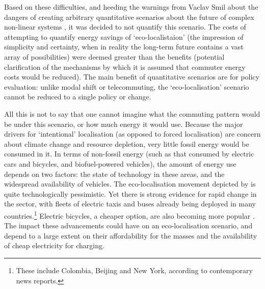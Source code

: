 Based on these difficulties, and heeding the warnings from Vaclav Smil about the dangers
of creating arbitrary quantitative scenarios about the future of complex non-linear systems
\citep{smil2000perils, Smil2008}, it was decided to not quantify this scenario.
The costs of attempting to quantify energy savings of `eco-localistaion'
(the impression of simplicity and certainty, when in reality the long-term future
contains a vast array of possibilities) were deemed greater
than the benefits (potential clarification of the mechanisms by which it is assumed that
commuter energy costs would be reduced). The main benefit of quantitative
scenarios are for policy evaluation: unlike modal shift or telecommuting,
the `eco-localisation' scenario cannot be reduced to a single policy or change.

All this is not to say that one cannot imagine what the commuting pattern would
be under this scenario, or how much energy it would use. Because the major drivers
for `intentional' localisation (as opposed to forced localisation) are
concern about climate change and resource depletion, very little
fossil energy would be consumed in it. In terms of non-fossil energy (such as
that consumed by electric cars and bicycles, and biofuel-powered vehicles),
the amount of energy use depends on two factors: the state of technology in
these areas, and the widespread availability of vehicles. The eco-localisation
movement depicted by \citet{North2010585} is quite technologically pessimistic.
Yet there is strong evidence for rapid change in the sector, with fleets of
electric taxis and buses already being deployed in many
countries.\footnote{These include Colombia, Beijing and New York, according
to contemporary news reports.
}
Electric bicycles, a cheaper option, are also becoming more popular \citep{Pierce2013}.
The impact these advancements could have on an eco-localisation scenario,
and depend to a large extent on their affordability for the masses and the
availability of cheap electricity for charging.

